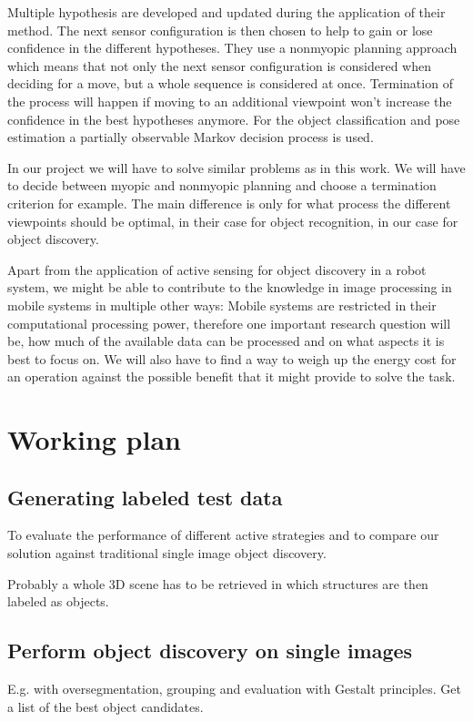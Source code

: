 \documentclass[a4paper,11pt,english]{article}
\begin{document}
Multiple hypothesis are developed and updated during the application of their method. The next sensor configuration is then chosen to help to gain or lose confidence in the different hypotheses.
They use a nonmyopic planning approach which means that not only the next sensor configuration is considered when deciding for a move, but a whole sequence is considered at once. 
Termination of the process will happen if moving to an additional viewpoint won't increase the confidence in the best hypotheses anymore.
For the object classification and pose estimation a partially observable Markov decision process is used.

In our project we will have to solve similar problems as in this work.
We will have to decide between myopic and nonmyopic planning and choose a termination criterion for example. The main difference is only for what process the different viewpoints should be optimal, in their case for object recognition, in our case for object discovery.\medskip

Apart from the application of active sensing for object discovery in a robot system, we might be able to contribute to the knowledge in image processing in mobile systems in multiple other ways:
Mobile systems are restricted in their computational processing power, therefore one important research question will be, how much of the available data can be processed and on what aspects it is best to focus on. 
We will also have to find a way to weigh up the energy cost for an operation against the possible benefit that it might provide to solve the task.

\section{Working plan}

\subsection{Generating labeled test data}
To evaluate the performance of different active strategies and to compare our solution against traditional single image object discovery.

Probably a whole 3D scene has to be retrieved in which structures are then labeled as objects.

\subsection{Perform object discovery on single images}
E.g. with oversegmentation, grouping and evaluation with Gestalt principles. Get a list of the best object candidates.
\end{document}

